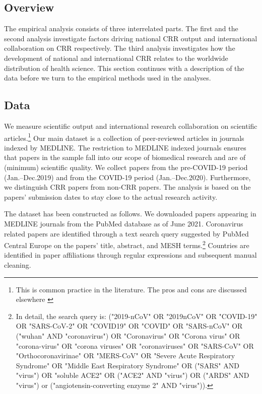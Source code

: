\subsection{Overview}

The empirical analysis consists of three interrelated parts. The first and the second analysis investigate factors driving national CRR output and international collaboration on CRR respectively. The third analysis investigates how the development of national and international CRR relates to the worldwide distribution of health science. This section continues with a description of the data before we turn to the empirical methods used in the analyses.


\subsection{Data}
\label{subsec:Data}
We measure scientific output and international research collaboration on scientific articles.\footnote{This is common practice in the literature. The pros and cons are discussed elsewhere \citep[][is the seminal reference]{katz1997research}} Our main dataset is a collection of peer-reviewed articles in journals indexed by MEDLINE. The restriction to MEDLINE indexed journals ensures that papers in the sample fall into our scope of biomedical research and are of (minimum) scientific quality. We collect papers from the pre-COVID-19 period (Jan.--Dec.2019) and from the COVID-19 period (Jan.--Dec.2020). Furthermore, we distinguish CRR papers from non-CRR papers. The analysis is based on the papers' submission dates to stay close to the actual research activity. 

The dataset has been constructed as follows. We downloaded papers appearing in MEDLINE journals from the PubMed database as of June 2021. Coronavirus related papers are identified through a text search query suggested by PubMed Central Europe on the papers' title, abstract, and MESH terms.\footnote{In detail, the search query is: ("2019-nCoV" OR "2019nCoV" OR "COVID-19" OR "SARS-CoV-2" OR "COVID19" OR "COVID" OR "SARS-nCoV" OR ("wuhan" AND "coronavirus") OR "Coronavirus" OR "Corona virus" OR "corona-virus" OR "corona viruses" OR "coronaviruses" OR "SARS-CoV" OR "Orthocoronavirinae" OR "MERS-CoV" OR "Severe Acute Respiratory Syndrome" OR "Middle East Respiratory Syndrome" OR ("SARS" AND "virus") OR "soluble ACE2" OR ("ACE2" AND "virus") OR ("ARDS" AND "virus") or ("angiotensin-converting enzyme 2" AND "virus")).} Countries are identified in paper affiliations through regular expressions and subsequent manual cleaning. %


